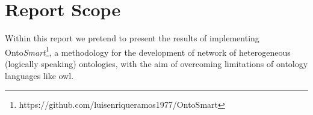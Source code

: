 
\newpage
\section{Report Scope}\label{scope}
Within this report we pretend to present the results of implementing Onto\textit{Smart}\footnote{https://github.com/luisenriqueramos1977/OntoSmart}, a methodology for the development of network of heterogeneous (logically speaking) ontologies, with the aim of overcoming limitations of ontology languages like \gls{owl}. 

